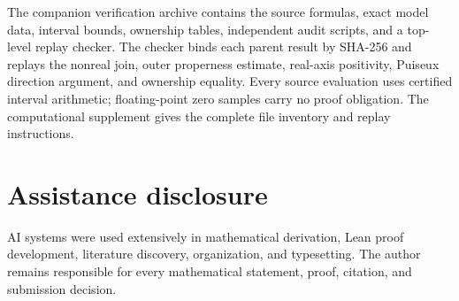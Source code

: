 \documentclass[11pt,a4paper]{amsart}
\theoremstyle{definition}
\theoremstyle{remark}
\begin{document}
The companion verification archive contains the source formulas, exact model
data, interval bounds, ownership tables, independent audit scripts, and a
top-level replay checker.  The checker binds each parent result by SHA-256 and
replays the nonreal join, outer properness estimate, real-axis positivity,
Puiseux direction argument, and ownership equality.  Every source evaluation
uses certified interval arithmetic; floating-point zero samples carry no
proof obligation.  The computational supplement gives the complete file
inventory and replay instructions.

\section*{Assistance disclosure}

AI systems were used extensively in mathematical derivation, Lean proof
development, literature discovery, organization, and typesetting.  The author
remains responsible for every mathematical statement, proof, citation, and
submission decision.



\end{document}
